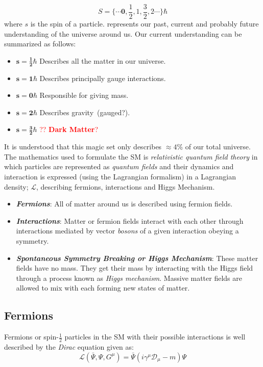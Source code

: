 \begin{equation*}
S =\{ \cdots \mathbf{0}, \frac{1}{2}, 1,  \frac{3}{2}, 2  \cdots \}\hbar 
\end{equation*}
where $s$ is the spin of a particle. 
 represents our past, current and probably future understanding of the universe around us. Our current understanding can be summarized as follows:
 \begin{itemize}
  \item $\mathbf{s = \frac{1}{2}\hbar}$ Describes all the matter in our universe.
  \item $\mathbf{s = 1\hbar}$ Describes principally gauge interactions.
  \item $\mathbf{s = 0\hbar}$ Responsible for giving mass.
  \item $\mathbf{s = 2\hbar}$ Describes gravity~(gauged?).
  \item $\mathbf{s = \frac{3}{2}\hbar}$ \textcolor{red}{?? \textbf{Dark Matter}?}
 \end{itemize}
It is understood that this magic set only describes $\approx 4$\% of our total universe.
\newline
The mathematics used to formulate the SM is \textit{relativistic quantum field theory} in which particles are represented as \textit{quantum fields} and their dynamics and interaction is expressed (using the Lagrangian formalism) in a Lagrangian density; $\mathcal{L}$, describing fermions, interactions and Higgs Mechanism.

\begin{itemize}
\item \textbf{\textit{Fermions}}: All of matter around us is described using fermion fields.
\item \textbf{\textit{Interactions}}: Matter or fermion fields interact with each other through interactions mediated by vector \textit{bosons} of a given interaction obeying a symmetry.
\item \textbf{\textit{Spontaneous Symmetry Breaking or Higgs Mechanism}}: These matter fields have no mass. They get their mass by interacting with the Higgs field through a process known as \textit{Higgs mechanism}. Massive matter fields are allowed to mix with each forming new states of matter.

\end{itemize}
\subsection*{Fermions}
Fermions or spin-$\frac{1}{2}$ particles in the SM with their possible interactions is well described by the \textit{Dirac} equation given as:
\begin{equation}
\mathcal{L}(\bar{\Psi},\Psi, G^{\mu}) = \bar{\Psi}\left(i \gamma^{\mu}\mathcal{D}_{\mu} - m \right)\Psi 
\end{equation}

